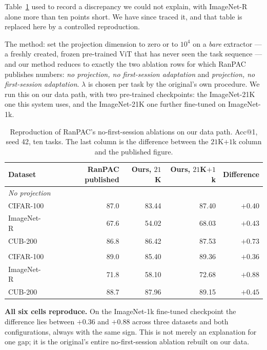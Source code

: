 \documentclass[11pt,a4paper]{article}
\begin{document}
Table~\ref{tab:nophase1} used to record a discrepancy we could not explain,
with ImageNet-R alone more than ten points short. We have since traced it, and
that table is replaced here by a controlled reproduction.

The method: set the projection dimension to zero or to $10^4$ on a \emph{bare}
extractor --- a freshly created, frozen pre-trained ViT that has never seen the
task sequence --- and our method reduces to exactly the two ablation rows for
which RanPAC publishes numbers: \emph{no projection, no first-session
adaptation} and \emph{projection, no first-session adaptation}. $\lambda$ is
chosen per task by the original's own procedure. We run this on our data path,
with two pre-trained checkpoints: the ImageNet-21K one this system uses, and the
ImageNet-21K one further fine-tuned on ImageNet-1k.

\begin{table}[htbp]
\centering
\caption{Reproduction of RanPAC's no-first-session ablations on our data path.
Acc@1, seed 42, ten tasks. The last column is the difference between the
$21$K$+1$k column and the published figure.}
\label{tab:nophase1}
\begin{tabular}{@{}lrrrr@{}}
\toprule
Dataset & RanPAC published & Ours, $21$K & Ours, $21$K$+1$k & Difference \\
\midrule
\multicolumn{5}{l}{\emph{No projection}}\\
CIFAR-100  & 87.0 & 83.44 & 87.40 & $+0.40$ \\
ImageNet-R & 67.6 & 54.02 & 68.03 & $+0.43$ \\
CUB-200    & 86.8 & 86.42 & 87.53 & $+0.73$ \\
\addlinespace
\multicolumn{5}{l}{\emph{Projection, $M = 10^4$}}\\
CIFAR-100  & 89.0 & 85.40 & 89.36 & $+0.36$ \\
ImageNet-R & 71.8 & 58.10 & 72.68 & $+0.88$ \\
CUB-200    & 88.7 & 87.96 & 89.15 & $+0.45$ \\
\bottomrule
\end{tabular}
\end{table}

\textbf{All six cells reproduce.} On the ImageNet-1k fine-tuned checkpoint the
difference lies between $+0.36$ and $+0.88$ across three datasets and both
configurations, always with the same sign. This is not merely an explanation for
one gap; it is the original's entire no-first-session ablation rebuilt on our
data.
\end{document}
